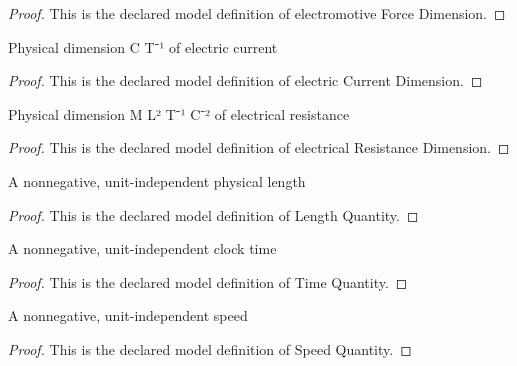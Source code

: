 \begin{proof}
  This is the declared model definition of electromotive Force Dimension.
\end{proof}
\begin{definition}
  \label{def:physics:phyx-mini-0931:phyxminiproblems-problemphyxmini0931-electriccurrentdimension}
  Physical dimension C T⁻¹ of electric current
\end{definition}
\begin{proof}
  This is the declared model definition of electric Current Dimension.
\end{proof}
\begin{definition}
  \label{def:physics:phyx-mini-0931:phyxminiproblems-problemphyxmini0931-electricalresistancedimension}
  Physical dimension M L² T⁻¹ C⁻² of electrical resistance
\end{definition}
\begin{proof}
  This is the declared model definition of electrical Resistance Dimension.
\end{proof}
\begin{definition}
  \label{def:physics:phyx-mini-0931:phyxminiproblems-problemphyxmini0931-lengthquantity}
  A nonnegative, unit-independent physical length
\end{definition}
\begin{proof}
  This is the declared model definition of Length Quantity.
\end{proof}
\begin{definition}
  \label{def:physics:phyx-mini-0931:phyxminiproblems-problemphyxmini0931-timequantity}
  A nonnegative, unit-independent clock time
\end{definition}
\begin{proof}
  This is the declared model definition of Time Quantity.
\end{proof}
\begin{definition}
  \label{def:physics:phyx-mini-0931:phyxminiproblems-problemphyxmini0931-speedquantity}
  A nonnegative, unit-independent speed
\end{definition}
\begin{proof}
  This is the declared model definition of Speed Quantity.
\end{proof}
